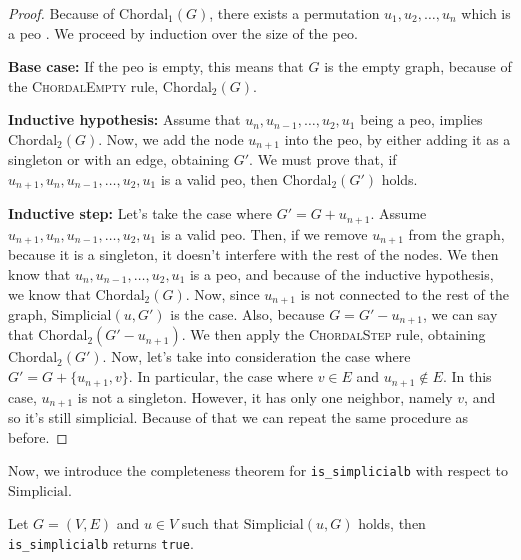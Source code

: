 \begin{proof}
    Because of Chordal$_1(G)$, there exists a permutation $u_1, u_2, \dots, u_n$ which is a \gls{peo} . We proceed by induction over the size of the \gls{peo}.

    \medskip

    \textbf{Base case:}
    If the \gls{peo} is empty, this means that $G$ is the empty graph, because of the \textsc{ChordalEmpty} rule, Chordal$_2(G)$.

    \medskip

    \textbf{Inductive hypothesis:}
    Assume that $u_n, u_{n-1}, \dots, u_2, u_1$ being a \gls{peo}, implies Chordal$_2(G)$. Now, we add the node $u_{n+1}$ into the \gls{peo}, by either adding it as a singleton or with an edge, obtaining $G'$. We must prove that, if $u_{n+1}, u_n, u_{n-1}, \dots, u_2, u_1$ is a valid \gls{peo}, then Chordal$_2(G')$ holds.

    \medskip

    \textbf{Inductive step:}
    Let's take the case where $G' = G + u_{n+1}$. Assume $u_{n+1}, u_{n}, u_{n-1}, \dots, u_2, u_1$ is a valid \gls{peo}. Then, if we remove $u_{n+1}$ from the graph, because it is a singleton, it doesn't interfere with the rest of the nodes. We then know that $u_n, u_{n-1}, \dots, u_2, u_1$ is a \gls{peo}, and because of the inductive hypothesis, we know that Chordal$_2(G)$. Now, since $u_{n+1}$ is not connected to the rest of the graph, Simplicial$(u, G')$ is the case. Also, because $G = G' - u_{n+1}$, we can say that Chordal$_2(G' - u_{n+1})$. We then apply the \textsc{ChordalStep} rule, obtaining Chordal$_2(G')$.
    Now, let's take into consideration the case where $G' = G + \{ u_{n+1}, v \}$. In particular, the case where $v \in E$ and $u_{n+1} \not \in E$. In this case, $u_{n+1}$ is not a singleton. However, it has only one neighbor, namely $v$, and so it's still simplicial. Because of that we can repeat the same procedure as before.
\end{proof}

Now, we introduce the completeness theorem for \texttt{is\_simplicialb} with respect to $\mathrm{Simplicial}$.

\begin{lemma}\label{lem:sbcomp}
Let $G = (V, E)$ and $u \in V$ such that $\mathrm{Simplicial}(u, G)$ holds, then \texttt{is\_simplicialb} returns \texttt{true}.
\end{lemma}

